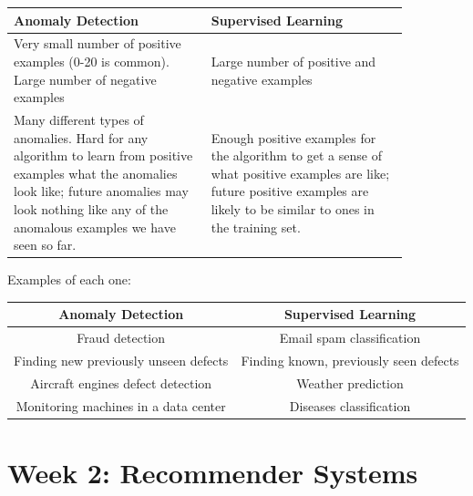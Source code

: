 \documentclass[a4paper, 12pt]{book}
\begin{document}
\begin{center}
\begin{tabular}{| p{0.43\linewidth} | p{0.43\linewidth} |}
 \hline
 \centering \textbf{ Anomaly Detection} & \centering \textbf{Supervised Learning} \tabularnewline
 \hline
 Very small number of positive examples (0-20 is common). Large number of negative examples & Large number of positive and negative examples \\ 
 Many different types of anomalies. Hard for any algorithm to learn from positive examples what the anomalies look like; future anomalies may look nothing like any of the anomalous examples we have seen so far. & Enough positive examples for the algorithm to get a sense of what positive examples are like; future positive examples are likely to be similar to ones in the training set.\\ 
 \hline
\end{tabular}
\end{center}

\noindent Examples of each one:

\begin{center}
\begin{tabular}{|c|c|}
 \hline
 \textbf{Anomaly Detection} & \textbf{Supervised Learning} \\
 \hline
 Fraud detection & Email spam classification \\ 
 Finding new previously unseen defects & Finding known, previously seen defects\\
 Aircraft engines defect detection & Weather prediction \\
 Monitoring machines in a data center & Diseases classification \\
 \hline
\end{tabular}
\end{center}

\section{Week 2: Recommender Systems}
\end{document}
